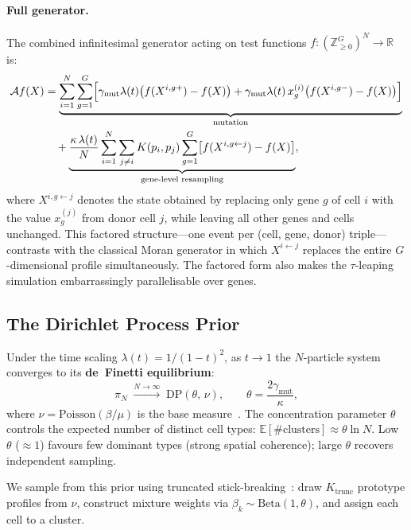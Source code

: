 \documentclass[11pt]{article}
\begin{document}
\paragraph{Full generator.}
The combined infinitesimal generator acting on test functions $f: (\mathbb{Z}_{\geq 0}^G)^N \to \mathbb{R}$ is:
\begin{align}
  \mathcal{A} f(X)
  &= \underbrace{\sum_{i=1}^{N}\sum_{g=1}^{G}\Bigl[
        \gamma_{\text{mut}}\lambda(t)\bigl(f(X^{i,g+}) - f(X)\bigr)
        + \gamma_{\text{mut}}\lambda(t)\, x_g^{(i)}\bigl(f(X^{i,g-}) - f(X)\bigr)
     \Bigr]}_{\text{mutation}}
  \notag\\
  &\quad + \underbrace{\frac{\kappa\,\lambda(t)}{N}\sum_{i=1}^{N}\sum_{j \neq i} K(p_i,p_j)
      \sum_{g=1}^{G}\bigl[f(X^{i,g \leftarrow j}) - f(X)\bigr]}_{\text{gene-level resampling}},
  \label{eq:generator}
\end{align}
where $X^{i,g \leftarrow j}$ denotes the state obtained by replacing only gene $g$ of cell $i$ with the value $x_g^{(j)}$ from donor cell $j$, while leaving all other genes and cells unchanged. This factored structure---one event per (cell, gene, donor) triple---contrasts with the classical Moran generator in which $X^{i \leftarrow j}$ replaces the entire $G$-dimensional profile simultaneously. The factored form also makes the $\tau$-leaping simulation embarrassingly parallelisable over genes.

\subsection{The Dirichlet Process Prior}

Under the time scaling $\lambda(t) = 1/(1-t)^2$, as $t \to 1$ the $N$-particle system converges to its \textbf{de~Finetti equilibrium}:
\[
  \pi_N \;\xrightarrow{N \to \infty}\; \text{DP}\!\left(\theta,\, \nu\right),
  \qquad \theta = \frac{2\gamma_{\text{mut}}}{\kappa},
\]
where $\nu = \text{Poisson}(\beta/\mu)$ is the base measure~\citep{ewens2004mathematical}. The concentration parameter $\theta$ controls the expected number of distinct cell types: $\mathbb{E}[\text{\# clusters}] \approx \theta \ln N$. Low $\theta$ ($\approx 1$) favours few dominant types (strong spatial coherence); large $\theta$ recovers independent sampling.

We sample from this prior using truncated stick-breaking~\citep{sethuraman1994constructive}: draw $K_{\text{trunc}}$ prototype profiles from $\nu$, construct mixture weights via $\beta_k \sim \text{Beta}(1, \theta)$, and assign each cell to a cluster.
\end{document}
